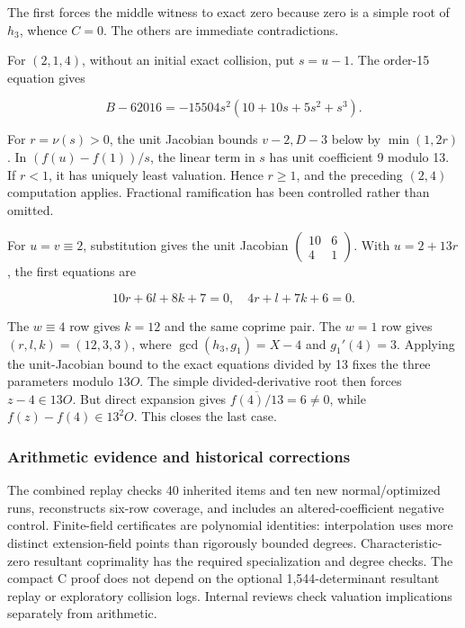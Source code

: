 \documentclass[
  british,
  10pt,
]{article}
\begin{document}
The first forces the middle witness to exact zero because zero is a
simple root of \(h_3\), whence \(C=0\). The others are immediate
contradictions.

For \((2,1,4)\), without an initial exact collision, put \(s=u-1\). The
order-15 equation gives

\[
B-62016=-15504s^2(10+10s+5s^2+s^3).
\]

For \(r=\nu(s)>0\), the unit Jacobian bounds \(v-2,D-3\) below by
\(\min(1,2r)\). In \((f(u)-f(1))/s\), the linear term in \(s\) has unit
coefficient 9 modulo 13. If \(r<1\), it has uniquely least valuation.
Hence \(r\ge1\), and the preceding \((2,4)\) computation applies.
Fractional ramification has been controlled rather than omitted.

For \(u=v\equiv2\), substitution gives the unit Jacobian
\(\begin{pmatrix}10&6\\4&1\end{pmatrix}\). With \(u=2+13r\), the first
equations are

\[
10r+6l+8k+7=0,\quad4r+l+7k+6=0.
\]

The \(w\equiv4\) row gives \(k=12\) and the same coprime pair. The
\(w=1\) row gives \((r,l,k)=(12,3,3)\), where \(\gcd(h_3,g_1)=X-4\) and
\(g_1'(4)=3\). Applying the unit-Jacobian bound to the exact equations
divided by 13 fixes the three parameters modulo \(13O\). The simple
divided-derivative root then forces \(z-4\in13O\). But direct expansion
gives \(\overline{f(4)/13}=6\ne0\), while \(f(z)-f(4)\in13^2O\). This
closes the last case.

\subsubsection{Arithmetic evidence and historical
corrections}\label{arithmetic-evidence-and-historical-corrections}

The combined replay checks 40 inherited items and ten new
normal/optimized runs, reconstructs six-row coverage, and includes an
altered-coefficient negative control. Finite-field certificates are
polynomial identities: interpolation uses more distinct extension-field
points than rigorously bounded degrees. Characteristic-zero resultant
coprimality has the required specialization and degree checks. The
compact C proof does not depend on the optional 1,544-determinant
resultant replay or exploratory collision logs. Internal reviews check
valuation implications separately from arithmetic.
\end{document}
